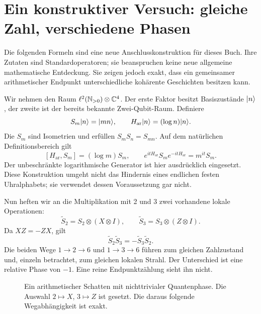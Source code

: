 \section{Ein konstruktiver Versuch: gleiche Zahl, verschiedene Phasen}
Die folgenden Formeln sind eine neue Anschlusskonstruktion für dieses Buch. Ihre Zutaten sind Standardoperatoren; sie beanspruchen keine neue allgemeine mathematische Entdeckung. Sie zeigen jedoch exakt, dass ein gemeinsamer arithmetischer Endpunkt unterschiedliche kohärente Geschichten besitzen kann.

Wir nehmen den Raum $\ell^2(\mathbb N_{>0})\otimes\mathbb C^4$. Der erste Faktor besitzt Basiszustände $\lvert n\rangle$, der zweite ist der bereits bekannte Zwei-Qubit-Raum. Definiere
\[
 S_m\lvert n\rangle=\lvert mn\rangle,\qquad H_{\mathrm{ar}}\lvert n\rangle=(\log n)\lvert n\rangle.
\]
Die $S_m$ sind Isometrien und erfüllen $S_mS_n=S_{mn}$. Auf dem natürlichen Definitionsbereich gilt
\[
 [H_{\mathrm{ar}},S_m]=(\log m)S_m,
 \qquad e^{itH_{\mathrm{ar}}}S_me^{-itH_{\mathrm{ar}}}=m^{it}S_m.
\]
Der unbeschränkte logarithmische Generator ist hier ausdrücklich eingesetzt. Diese Konstruktion umgeht nicht das Hindernis eines endlichen festen Uhralphabets; sie verwendet dessen Voraussetzung gar nicht.

Nun heften wir an die Multiplikation mit 2 und 3 zwei vorhandene lokale Operationen:
\begin{equation}
 \widetilde S_2=S_2\otimes(X\otimes I),\qquad
 \widetilde S_3=S_3\otimes(Z\otimes I).
\end{equation}
Da $XZ=-ZX$, gilt
\begin{equation}
 \widetilde S_2\widetilde S_3=-\widetilde S_3\widetilde S_2.
 \label{eq:arithmetic-projective}
\end{equation}
Die beiden Wege $1\to2\to6$ und $1\to3\to6$ führen zum gleichen Zahlzustand und, einzeln betrachtet, zum gleichen lokalen Strahl. Der Unterschied ist eine relative Phase von $-1$. Eine reine Endpunktzählung sieht ihn nicht.

\begin{figure}[H]\centering
{}
\caption{Ein arithmetischer Schatten mit nichttrivialer Quantenphase. Die Auswahl $2\mapsto X$, $3\mapsto Z$ ist gesetzt. Die daraus folgende Wegabhängigkeit ist exakt.}
\end{figure}

